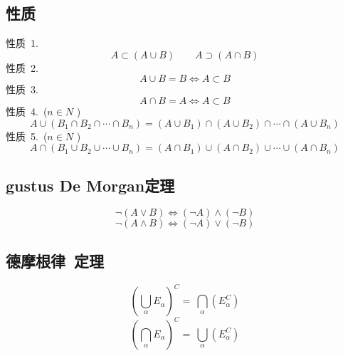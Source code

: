 \subsection{性质}
性质\ 1.
\begin{equation}
A\subset(A\cup B) {\qquad}A\supset(A\cap B)
\end{equation}
性质\ 2.
\begin{equation}
A\cup B = B\Leftrightarrow A\subset B
\end{equation}
性质\ 3.
\begin{equation}
A\cap B = A\Leftrightarrow A\subset B
\end{equation}
性质\ 4.\ (\(n\in N\) )
\begin{equation}
A\cup(B_1\cap B_2\cap\cdots\cap B_n) = (A\cup B_1)\cap(A\cup B_2)\cap\cdots\cap(A\cup B_n)
\end{equation}
性质\ 5.\ (\(n\in N\) )
\begin{equation}
A\cap(B_1\cup B_2\cup\cdots\cup B_n) = (A\cap B_1)\cup(A\cap B_2)\cup\cdots\cup(A\cap B_n)
\end{equation}

\subsection{gustus De Morgan定理}
$$\neg(A\vee B)\Leftrightarrow(\neg A)\land(\neg B)$$
$$\neg(A\land B)\Leftrightarrow(\neg A)\vee(\neg B)$$
\subsection{德摩根律\ 定理}
$$\left(\bigcup\limits_{\alpha}^{}E_\alpha\right)^C =\  \bigcap\limits_{\alpha}^{}(E_\alpha^C)$$
$$\left(\bigcap\limits_{\alpha}^{}E_\alpha\right)^C =\  \bigcup\limits_{\alpha}^{}(E_\alpha^C)$$
